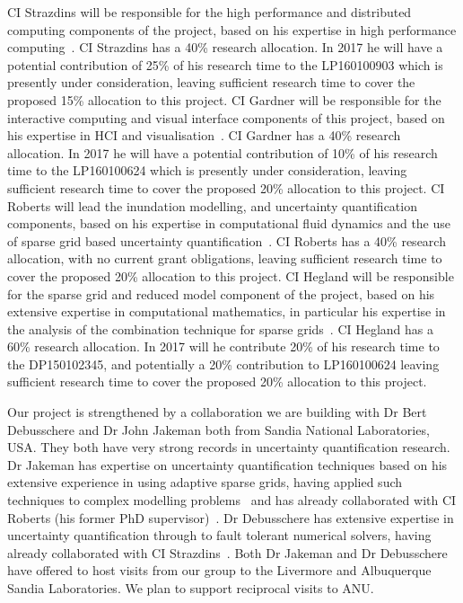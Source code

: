 CI Strazdins will be
responsible for the high performance and distributed computing
components of the project, based on his expertise in high performance
computing~\parencite{AliEtal2015,StrazdinsEtal2015,Ali11022016}.  
CI Strazdins has a 40\% research allocation. In 2017 he will have a 
potential contribution of 25\% of his research time to the LP160100903 which 
is presently under consideration,  leaving sufficient research 
time to cover the proposed 15\% allocation to this project. 
%
CI Gardner will be responsible for the interactive computing and visual 
interface components of this project, based on his expertise in HCI and 
visualisation~\parencite{martin2016intelligent,martin2015tracking,swift2014coding,
swift2013visual,sorensen2010programming,swiftLive2016}.  
CI Gardner has a 40\% research allocation. In 2017 he will have a 
potential contribution of 10\% of his research time to the LP160100624 which 
is presently under consideration, leaving sufficient research time to cover 
the proposed 20\% allocation to this project. 
%
CI Roberts will lead the inundation modelling, and
uncertainty quantification components, based on his expertise in
computational fluid dynamics and the use of sparse grid based
uncertainty quantification~\parencite{deBaarRDM2015,JakemanRoberts2013,anugamanual,nielsen2005hydrodynamic}.  
CI Roberts has a 40\% research allocation, with no current grant obligations,  
leaving sufficient research time to cover the proposed 20\% allocation to this project. 
%
CI Hegland will be responsible for the
sparse grid and reduced model component of the project, based on his
extensive expertise in computational mathematics, in particular his
expertise in the analysis of the combination technique for sparse
grids~\parencite{AliEtal2015,HardingHLS2015,Ali11022016}. 
CI Hegland has a 60\% research allocation. In 2017 will he contribute 
20\% of his research time to the DP150102345, and potentially a  20\% 
contribution to LP160100624 leaving sufficient research time 
to cover the proposed 20\% allocation to this project. 

Our project is strengthened by a collaboration we are building with Dr Bert Debusschere and 
Dr John Jakeman  both from Sandia National Laboratories, USA. They both have
very strong records in uncertainty quantification research.  
Dr Jakeman has expertise on uncertainty
quantification techniques based on his extensive experience in using adaptive sparse grids,
having applied such techniques to complex modelling 
problems~\parencite{JakemanRoberts2013,jakemanNumerical2010,Jakeman2015} and 
has already collaborated with CI Roberts (his former PhD supervisor)~\parencite{JakemanRoberts2013}.
Dr Debusschere has extensive expertise in uncertainty
quantification through to fault tolerant numerical solvers, having already 
collaborated with CI Strazdins~\parencite{parSGCT16}.
Both Dr Jakeman and Dr Debusschere have offered to host visits from our group to the 
Livermore and  Albuquerque Sandia Laboratories. We plan to support reciprocal visits to ANU. 

